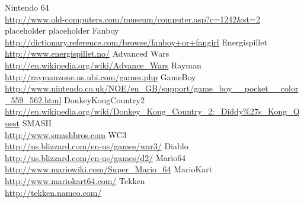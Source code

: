 \begin{thebibliography}{1} %
	Nintendo 64\\\url{http://www.old-computers.com/museum/computer.asp?c=1242&st=2}
	placeholder
	placeholder
	Fanboy\\\url{http://dictionary.reference.com/browse/fanboy+or+fangirl}
	Energispillet\\\url{http://www.energispillet.no/}
	Advanced Wars\\\url{http://en.wikipedia.org/wiki/Advance\_Wars}
	Rayman\\\url{http://raymanzone.us.ubi.com/games.php}
	GameBoy\\\url{http://www.nintendo.co.uk/NOE/en_GB/support/game_boy__pocket__color_559_562.html}
	DonkeyKongCountry2\\\url{http://en.wikipedia.org/wiki/Donkey_Kong_Country_2:_Diddy%27s_Kong_Quest}
	SMASH\\\url{http://www.smashbros.com}
	WC3\\\url{http://us.blizzard.com/en-us/games/war3/}
	Diablo\\\url{http://us.blizzard.com/en-us/games/d2/}
	Mario64\\\url{http://www.mariowiki.com/Super_Mario_64}
	MarioKart\\\url{http://www.mariokart64.com/}
	Tekken\\\url{http://tekken.namco.com/}
\end{thebibliography}
